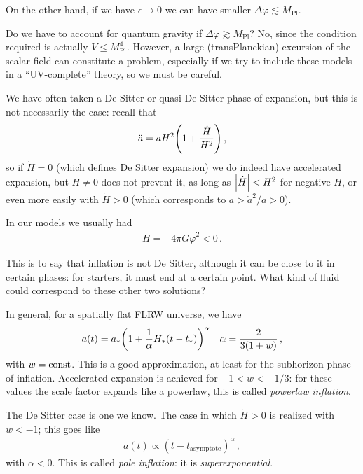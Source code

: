 \documentclass[main.tex]{subfiles}
\begin{document}


On the other hand, if we have \(\epsilon \to 0\) we can have smaller \(\Delta \varphi \lesssim M _{\text{Pl}}\). 

Do we have to account for quantum gravity if \(\Delta \varphi \gtrsim M _{\text{Pl}}\)? No, since the condition required is actually \(V \leq M _{\text{Pl}}^{4}\).
However, a large (transPlanckian) excursion of the scalar field can constitute a problem, especially if we try to include these models in a ``UV-complete'' theory, so we must be careful.

We have often taken a De Sitter or quasi-De Sitter phase of expansion, but this is not necessarily the case: recall that 
%
\begin{align}
\ddot{a} = a H^2 \qty(1 + \frac{\dot{H}}{H^2})
\,,
\end{align}
%
so if \(\dot{H} = 0\) (which defines De Sitter expansion) we do indeed have accelerated expansion, but \(\dot{H} \neq 0 \) does not prevent it, as long as \(\abs{\dot{H}} < H^2\) for negative \(\dot{H}\), or even more easily with \(\dot{H} > 0\) (which corresponds to \(\ddot{a} > \dot{a}^2 / a  > 0\)). 

In our models we usually had 
%
\begin{align} \label{eq:derivative-Hubble-parameter-scalar-field}
\dot{H} = - 4 \pi G \dot{\varphi}^2 < 0
\,.
\end{align}

This is to say that inflation is not De Sitter, although it can be close to it in certain phases: for starters, it must end at a certain point. 
What kind of fluid could correspond to these other two solutions? 

In general, for a spatially flat FLRW universe, we have 
%
\begin{align}
a(t) = a_* \qty(1 + \frac{1}{\alpha } H_*(t- t_*))^{\alpha }
&& \alpha = \frac{2}{3 (1+w)}
\,,
\end{align}
%
with \(w = \text{const}\). This is a good approximation, at least for the subhorizon phase of inflation.
Accelerated expansion is achieved for \(-1 < w < - 1/3\): for these values the scale factor expands like a powerlaw, this is called \emph{powerlaw inflation}. 

The De Sitter case is one we know. 
The case in which \(\dot{H} >0\) is realized with \(w < -1\); this goes like 
%
\begin{align}
a(t ) \propto (t-t _{\text{asymptote}})^{\alpha } 
\,,
\end{align}
%
with \(\alpha < 0\). This is called \emph{pole inflation}: it is \emph{superexponential}. 
\end{document}
